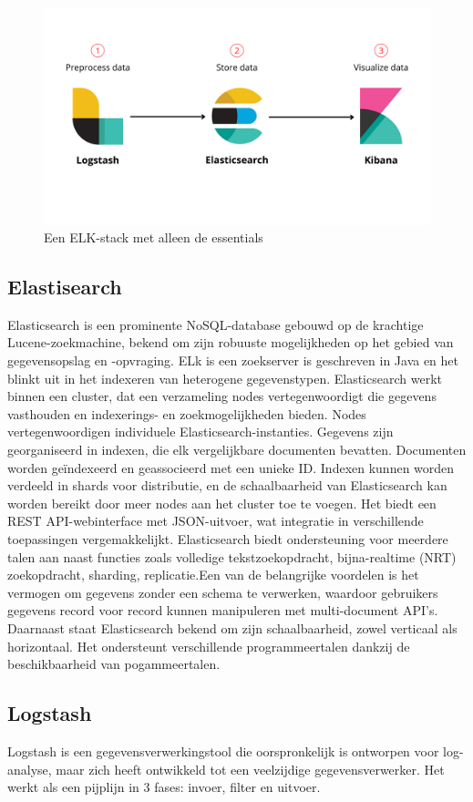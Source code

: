 \begin{figure}[h]
    \centering
    \includegraphics[width=0.5\linewidth]{bachproef//graphics/ELK_stack_essentials.png}
    \caption{Een ELK-stack met alleen de essentials ~\autocite{DavidTaylor}}
    \label{fig:Een ELK-stack met alleen de essentials}
\end{figure}

\subsection{Elastisearch}
Elasticsearch is een prominente NoSQL-database gebouwd op de krachtige Lucene-zoekmachine, bekend om zijn robuuste mogelijkheden op het gebied van gegevensopslag en -opvraging. ELk is een zoekserver is geschreven in Java en het blinkt uit in het indexeren van heterogene gegevenstypen. Elasticsearch werkt binnen een cluster, dat een verzameling nodes vertegenwoordigt die gegevens vasthouden en indexerings- en zoekmogelijkheden bieden. Nodes vertegenwoordigen individuele Elasticsearch-instanties. Gegevens zijn georganiseerd in indexen, die elk vergelijkbare documenten bevatten. Documenten worden geïndexeerd en geassocieerd met een unieke ID. Indexen kunnen worden verdeeld in shards voor distributie, en de schaalbaarheid van Elasticsearch kan worden bereikt door meer nodes aan het cluster toe te voegen. Het biedt een REST API-webinterface met JSON-uitvoer, wat integratie in verschillende toepassingen vergemakkelijkt. Elasticsearch biedt ondersteuning voor meerdere talen aan naast functies zoals volledige tekstzoekopdracht, bijna-realtime (NRT) zoekopdracht, sharding, replicatie.Een van de belangrijke voordelen is het vermogen om gegevens zonder een schema te verwerken, waardoor gebruikers gegevens record voor record kunnen manipuleren met multi-document API's. Daarnaast staat Elasticsearch bekend om zijn schaalbaarheid, zowel verticaal als horizontaal. Het ondersteunt verschillende programmeertalen dankzij de beschikbaarheid van pogammeertalen. ~\autocite{GedalBer}  

\subsection{Logstash}
Logstash is een gegevensverwerkingstool die oorspronkelijk is ontworpen voor log-analyse, maar zich heeft ontwikkeld tot een veelzijdige gegevensverwerker. Het werkt als een pijplijn in 3 fases: invoer, filter en uitvoer.~\autocite{Jamie2017,JugensToit}  

